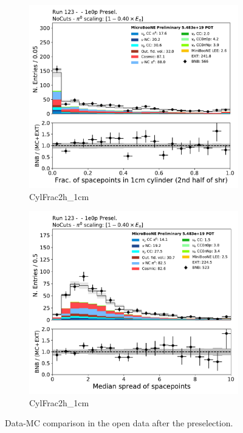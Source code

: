 \begin{figure}[H] 
\begin{center}
    \begin{subfigure}[b]{0.3\textwidth}
    \centering
    \includegraphics[width=1.00\textwidth]{1e0p/dataMCRun123/CylFrac2h_1cm.pdf}
    \caption{\label{fig:1e0p:dataMCRun1:shr_tkfit_gap10_dedx_U} CylFrac2h\_1cm }
    \end{subfigure}
    \begin{subfigure}[b]{0.3\textwidth}
    \centering
    \includegraphics[width=1.00\textwidth]{1e0p/dataMCRun123/DeltaRMS2h.pdf}
    \caption{\label{fig:1e0p:dataMCRun1:shr_tkfit_gap10_dedx_U} CylFrac2h\_1cm }
    \end{subfigure}
\caption{\label{fig:1e0p:dataMCRun1:shr_tkfit_dedx_2cm}Data-MC comparison in the open data after the \zpsel preselection.}
\end{center}
\end{figure}

